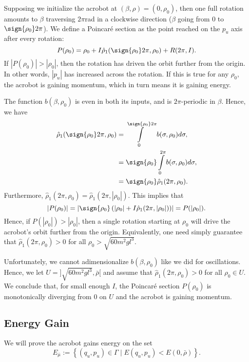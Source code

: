 Supposing we initialize the acrobot at \((\beta,\rho) = (0,\rho_0)\),
then one full rotation amounts to \(\beta\) traversing \(2\pi\)rad in a clockwise
direction (\ie \(\beta\) going from \(0\) to \(\sign{\rho_0}2\pi\)).
We define a Poincar\'{e} section as the point reached on the \(p_u\) axis after
every rotation:
\[
    P(\rho_0) = \rho_0 + I \hat{\rho}_1(\sign{\rho_0}2\pi, \rho_0)
      + R(2\pi,I)
    .
\]
If \(|P(\rho_0)| > |\rho_0|\), then the rotation has
driven the orbit further from the origin.
In other words, \(|p_u|\) has increased across the rotation.
If this is true for any \(\rho_0\), the acrobot is gaining momentum, which in
turn means it is gaining energy.

The function \(b(\beta,\rho_0)\) is even in both its inputs, and is 
\(2\pi\)-periodic in \(\beta\).
Hence, we have 
\begin{align*}
    \hat{\rho}_1(\sign{\rho_0}2\pi, \rho_0) &=
    \int \limits_0^{\sign{\rho_0}2\pi} b(\sigma,\rho_0)d\sigma
    , \\
     &=\sign{\rho_0}\int\limits_0^{2\pi}b(\sigma,\rho_0)d\sigma
     , \\
     &= \sign{\rho_0} \hat{\rho}_1(2\pi,\rho_0)
     .
\end{align*}
Furthermore, \(\hat{\rho}_1(2\pi,\rho_0) = \hat{\rho}_1(2\pi,|\rho_0|)\).
This implies that
\[
    |P(\rho_0)| = \left|\sign{\rho_0}\left(
        |\rho_0| + I \hat{\rho}_1(2\pi,|\rho_0|)\right)
    \right|
    = P(|\rho_0|)
    .
\]
Hence, if \(P(|\rho_0|) > |\rho_0|\), then a single rotation starting at \(\rho_0\)
will drive the acrobot's orbit further from the origin.
Equivalently, one need simply guarantee that \(\hat{\rho}_1(2\pi,\rho_0) > 0\)
for all \(\rho_0 > \sqrt{60m^2gl^3}\).

Unfortunately, we cannot adimensionalize
\(b(\beta,\rho_0)\) like we did for oscillations. 
Hence, we let \(U = ]\sqrt{60m^2gl^3},\bar{\rho}[\) and assume that 
\(\hat{\rho}_1(2\pi,\rho_0) > 0 \) for all \(\rho_0 \in U\).
We conclude that, for small enough \(I\), the Poincar\'{e} section 
\(P(\rho_0)\) is monotonically diverging from 0 on \(U\)
and the acrobot is gaining momentum.

\subsection*{Energy Gain}
We will prove the acrobot gains energy on the set 
\[
    E_{\bar{\mu}} := 
    \left\{ (q_u,p_u) \in \Gamma \mid E(q_u,p_u) < E(0,\bar{\rho}) \right\}
    .
\]

